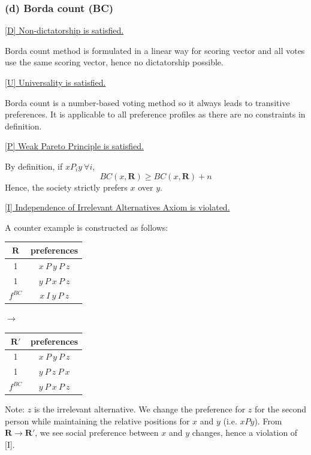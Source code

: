 \documentclass[a4paper]{article}
\begin{document}
\subsubsection*{(d) Borda count (BC)}

\underline{[D] Non-dictatorship is satisfied.} 

Borda count method is formulated in a linear way for scoring vector and all votes use the same scoring vector, hence no dictatorship possible.

\underline{[U] Universality is satisfied.}

Borda count is a number-based voting method so it always leads to transitive preferences. It is applicable to all preference profiles as there are no constraints in definition.

\underline{[P] Weak Pareto Principle is satisfied.}

By definition, if $xP_i y\:\forall i$, 
\[BC(x, \mathbf{R})\geq BC(x, \mathbf{R}) + n \]
Hence, the society strictly prefers $x$ over $y$.

\underline{[I] Independence of Irrelevant Alternatives Axiom is violated.}

A counter example is constructed as follows:

\begin{table}[!htbp]
    \centering
    \begin{tabular}{c|c|}
        $\mathbf{R}$ & preferences         \\ 
        \hline
        1  & $x\: P\: y\: P\: z$ \\
        1  & $y\: P\: x\: P\: z$ \\
        \hline 
        $f^{BC}$ & $x\: I\: y\: P\: z$
    \end{tabular}
    \qquad $\to$ \qquad
    \centering
    \begin{tabular}{c|c|}
        $\mathbf{R'}$ & preferences         \\ 
        \hline
        1  & $x\: P\: y\: P\: z$ \\
        1  & $y\: P\: z\: P\: x$ \\
        \hline 
        $f^{BC}$ & $y\: P\: x\: P\: z$
    \end{tabular}
\end{table}

Note: $z$ is the irrelevant alternative. We change the preference for $z$ for the second person while maintaining the relative positions for $x$ and $y$ (i.e. $xPy$). From $\mathbf{R}\to\mathbf{R'}$, we see social preference between $x$ and $y$ changes, hence a violation of [I].
\end{document}
